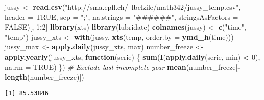 \documentclass[]{book}
\newenvironment{Shaded}{\begin{snugshade}}{\end{snugshade}}
\newcommand{\KeywordTok}[1]{\textcolor[rgb]{0.13,0.29,0.53}{\textbf{#1}}}
\newcommand{\DataTypeTok}[1]{\textcolor[rgb]{0.13,0.29,0.53}{#1}}
\newcommand{\DecValTok}[1]{\textcolor[rgb]{0.00,0.00,0.81}{#1}}
\newcommand{\StringTok}[1]{\textcolor[rgb]{0.31,0.60,0.02}{#1}}
\newcommand{\CommentTok}[1]{\textcolor[rgb]{0.56,0.35,0.01}{\textit{#1}}}
\newcommand{\OtherTok}[1]{\textcolor[rgb]{0.56,0.35,0.01}{#1}}
\newcommand{\ControlFlowTok}[1]{\textcolor[rgb]{0.13,0.29,0.53}{\textbf{#1}}}
\newcommand{\OperatorTok}[1]{\textcolor[rgb]{0.81,0.36,0.00}{\textbf{#1}}}
\newcommand{\NormalTok}[1]{#1}
\begin{document}
\begin{Shaded}
\begin{Highlighting}[]
\NormalTok{jussy <-}\StringTok{ }\KeywordTok{read.csv}\NormalTok{(}\StringTok{"http://sma.epfl.ch/~lbelzile/math342/jussy_temp.csv"}\NormalTok{, }\DataTypeTok{header =} \OtherTok{TRUE}\NormalTok{, }
    \DataTypeTok{sep =} \StringTok{";"}\NormalTok{, }\DataTypeTok{na.strings =} \StringTok{"######"}\NormalTok{, }\DataTypeTok{stringsAsFactors =} \OtherTok{FALSE}\NormalTok{)[, }\DecValTok{1}\OperatorTok{:}\DecValTok{2}\NormalTok{]}
\KeywordTok{library}\NormalTok{(xts)}
\KeywordTok{library}\NormalTok{(lubridate)}
\KeywordTok{colnames}\NormalTok{(jussy) <-}\StringTok{ }\KeywordTok{c}\NormalTok{(}\StringTok{"time"}\NormalTok{, }\StringTok{"temp"}\NormalTok{)}
\NormalTok{jussy_xts <-}\StringTok{ }\KeywordTok{with}\NormalTok{(jussy, }\KeywordTok{xts}\NormalTok{(temp, }\DataTypeTok{order.by =} \KeywordTok{ymd_h}\NormalTok{(time)))}
\NormalTok{jussy_max <-}\StringTok{ }\KeywordTok{apply.daily}\NormalTok{(jussy_xts, max)}
\NormalTok{number_freeze <-}\StringTok{ }\KeywordTok{apply.yearly}\NormalTok{(jussy_xts, }\ControlFlowTok{function}\NormalTok{(serie) \{}
    \KeywordTok{sum}\NormalTok{(}\KeywordTok{I}\NormalTok{(}\KeywordTok{apply.daily}\NormalTok{(serie, min) }\OperatorTok{<}\StringTok{ }\DecValTok{0}\NormalTok{), }\DataTypeTok{na.rm =} \OtherTok{TRUE}\NormalTok{)}
\NormalTok{\})}
\CommentTok{# Exclude last incomplete year}
\KeywordTok{mean}\NormalTok{(number_freeze[}\OperatorTok{-}\KeywordTok{length}\NormalTok{(number_freeze)])}
\end{Highlighting}
\end{Shaded}

\begin{verbatim}
[1] 85.53846
\end{verbatim}

\begin{Shaded}
\end{Shaded}
\end{document}
